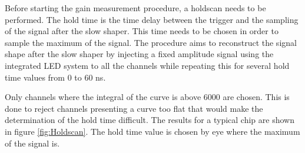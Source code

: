 Before starting the gain measurement procedure, a holdscan needs to be performed. The hold time is the time delay between the trigger and the sampling of the signal after the slow shaper. This time needs to be chosen in order to sample the maximum of the signal. The procedure aims to reconstruct the signal shape after the slow shaper by injecting a fixed amplitude signal using the integrated LED system to all the channels while repeating this for several hold time values from 0 to 60 ns.

Only channels where the integral of the curve is above 6000 are chosen. This is done to reject channels presenting a curve too flat that would make the determination of the hold time difficult. The results for a typical chip are shown in figure \ref{fig:Holdscan}. The hold time value is chosen by eye where the maximum of the signal is.

